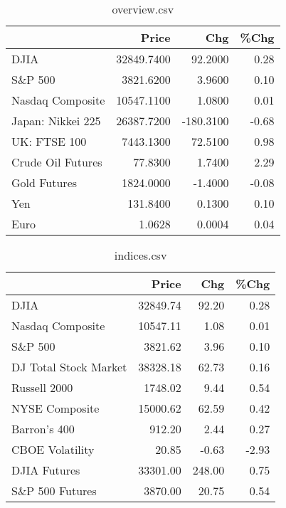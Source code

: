 \documentclass{article}%
\begin{document}
\begin{table}[htbp]%
\caption{overview.csv}%
\centering%
\begin{adjustbox}{width=1\textwidth}%
\begin{tabular}{lrrr}
\toprule
                  &      Price &       Chg &  \%Chg \\
\midrule
             DJIA & 32849.7400 &   92.2000 &  0.28 \\
          S\&P 500 &  3821.6200 &    3.9600 &  0.10 \\
 Nasdaq Composite & 10547.1100 &    1.0800 &  0.01 \\
Japan: Nikkei 225 & 26387.7200 & -180.3100 & -0.68 \\
     UK: FTSE 100 &  7443.1300 &   72.5100 &  0.98 \\
Crude Oil Futures &    77.8300 &    1.7400 &  2.29 \\
     Gold Futures &  1824.0000 &   -1.4000 & -0.08 \\
              Yen &   131.8400 &    0.1300 &  0.10 \\
             Euro &     1.0628 &    0.0004 &  0.04 \\
\bottomrule
\end{tabular}
%
\end{adjustbox}%
\end{table}

%


\begin{table}[htbp]%
\caption{indices.csv}%
\centering%
\begin{adjustbox}{width=1\textwidth}%
\begin{tabular}{lrrr}
\toprule
                      &    Price &    Chg &  \%Chg \\
\midrule
                 DJIA & 32849.74 &  92.20 &  0.28 \\
     Nasdaq Composite & 10547.11 &   1.08 &  0.01 \\
              S\&P 500 &  3821.62 &   3.96 &  0.10 \\
DJ Total Stock Market & 38328.18 &  62.73 &  0.16 \\
         Russell 2000 &  1748.02 &   9.44 &  0.54 \\
       NYSE Composite & 15000.62 &  62.59 &  0.42 \\
         Barron's 400 &   912.20 &   2.44 &  0.27 \\
      CBOE Volatility &    20.85 &  -0.63 & -2.93 \\
         DJIA Futures & 33301.00 & 248.00 &  0.75 \\
      S\&P 500 Futures &  3870.00 &  20.75 &  0.54 \\
\bottomrule
\end{tabular}
%
\end{adjustbox}%
\end{table}
\end{document}
